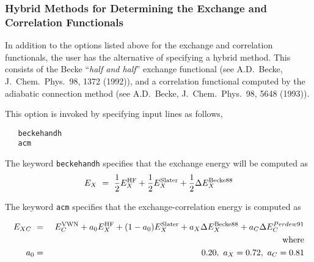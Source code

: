 \subsubsection{Hybrid Methods for Determining the Exchange and Correlation 
Functionals}

In addition to the options listed above for the exchange and correlation
functionals, the user has the alternative of specifying a hybrid
method.  This consists of the Becke ``{\sl half and half}'' exchange 
functional (see A.D.~Becke, J.~Chem.~Phys.~98, 1372 (1992)), and a
correlation functional computed by the adiabatic connection method
(see A.D.~Becke, J.~Chem.~Phys.~98, 5648 (1993)).  

This option is invoked
by specifying input lines as follows,


\begin{verbatim}
   beckehandh
   acm
\end{verbatim}

The keyword \verb+beckehandh+ specifies that the exchange energy will be
computed as
\begin{eqnarray*}
E_{X} \ = \ \frac{1}{2} E^{\rm HF}_X + \frac{1}{2} E^{\rm Slater}_{X} +
\frac{1}{2} \Delta E^{\rm Becke88}_{X} 
\end{eqnarray*}

The keyword \verb+acm+ specifies that the exchange-correlation energy
is computed as


\begin{eqnarray*}
E_{XC} \ &=& \ E^{\rm VWN}_C + a_0 E^{\rm HF}_X + (1-a_0) E^{\rm Slater}_{X} +
a_X \Delta E^{\rm Becke88}_{X} + a_C \Delta E^{Perdew91}_C \\
& &{\rm where } \\
a_0 &=& 0.20, \ a_X = 0.72, \ a_C = 0.81
\end{eqnarray*}

